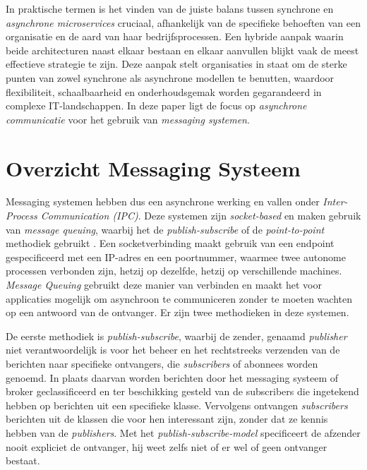 In praktische termen is het vinden van de juiste balans tussen synchrone en \emph{asynchrone microservices} cruciaal, 
afhankelijk van de specifieke behoeften van een organisatie en de aard van haar bedrijfsprocessen. 
Een hybride aanpak waarin beide architecturen naast elkaar bestaan en elkaar aanvullen blijkt vaak de meest effectieve strategie te zijn. 
Deze aanpak stelt organisaties in staat om de sterke punten van zowel synchrone als asynchrone modellen te benutten, 
waardoor flexibiliteit, schaalbaarheid en onderhoudsgemak worden gegarandeerd in complexe \newline IT-landschappen.
In deze paper ligt de focus op \emph{asynchrone communicatie} voor het gebruik van \emph{messaging systemen}.
\newline

\section{Overzicht Messaging Systeem}
Messaging systemen hebben dus een asynchrone werking en vallen onder \newline \emph{Inter-Process Communication (IPC)}. 
Deze systemen zijn \emph{socket-based} en maken gebruik van \emph{message queuing}, waarbij het de \emph{publish-subscribe} of de \emph{point-to-point} methodiek gebruikt \autocite{Dinari2020}. 
\newline
Een socketverbinding maakt gebruik van een endpoint gespecificeerd met een IP-adres en een \newline poortnummer, 
waarmee twee autonome processen verbonden zijn, hetzij op dezelfde, hetzij op verschillende machines.
\newline
\emph{Message Queuing} gebruikt deze manier van verbinden en maakt het voor applicaties mogelijk om asynchroon 
te communiceren zonder te moeten wachten op een antwoord van de ontvanger. 
Er zijn twee methodieken in deze systemen. 
\newline

De eerste methodiek is \emph{publish-subscribe}, waarbij de zender, genaamd \emph{publisher} niet verantwoordelijk is voor het beheer 
en het rechtstreeks verzenden van de berichten naar specifieke ontvangers, die \emph{subscribers} of abonnees worden genoemd. 
In plaats daarvan worden berichten door het messaging systeem of broker geclassificeerd en ter 
beschikking gesteld van de subscribers die ingetekend hebben op berichten uit een specifieke klasse.
Vervolgens ontvangen \emph{subscribers} berichten uit de klassen die voor hen interessant zijn, zonder dat ze kennis hebben van de \emph{publishers}.
Met het \emph{publish-subscribe-model} specificeert de afzender nooit expliciet de ontvanger,
hij weet zelfs niet of er wel of geen ontvanger bestaat.
\newline

